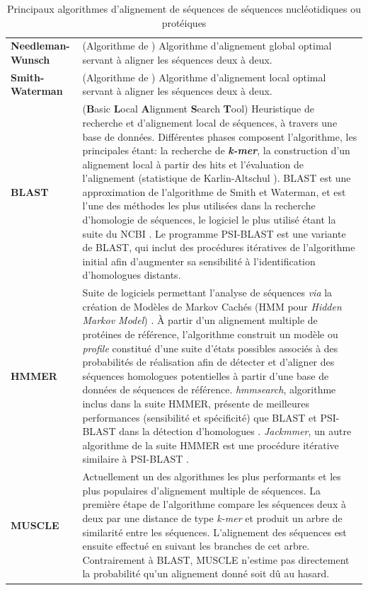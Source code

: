 \newpage
\begin{longtable}{@{\hspace{-2cm}}  >{\bfseries}p{} | >{\small}p{}}
	\caption[Principaux algorithmes d'alignement de séquences]{Principaux algorithmes d'alignement de séquences de séquences nucléotidiques ou protéiques}\label{align}\\
	 Needleman-Wunsch& (Algorithme de ) \citep{needleman1970general} Algorithme d'alignement global optimal servant à aligner les séquences deux à deux. \\[0.4cm]
	 Smith-Waterman & (Algorithme de ) \citep{smith1981identification} Algorithme d'alignement local optimal servant à aligner les séquences deux à deux. \\[0.4cm]
	BLAST & (\textbf{B}asic \textbf{L}ocal \textbf{A}lignment \textbf{S}earch \textbf{T}ool) \citep{altschul1990basic} Heuristique de recherche et d'alignement local de séquences, à travers une base de données. Différentes phases composent l'algorithme, les principales étant: la recherche de \textbf{\textit{k-mer}}, la construction d'un alignement local à partir des hits et l'évaluation de l'alignement (statistique de  Karlin-Altschul \citep{korf2003blast}). BLAST est une approximation de l'algorithme de Smith et Waterman, et est l'une des méthodes les plus utilisées dans la recherche d'homologie de séquences, le logiciel le plus utilisé étant la suite du NCBI \citep{Camacho2009}. Le programme PSI-BLAST \citep{altschul1997gapped} est une variante de BLAST, qui inclut des procédures itératives de l'algorithme initial afin d'augmenter sa sensibilité à l'identification d'homologues distants.\\[0.4cm]
	HMMER & \citep{finn2011hmmer} Suite de logiciels permettant l'analyse de séquences \textit{via} la création de Modèles de Markov Cachés (HMM pour \textit{Hidden Markov Model}) \citep{eddy1998profile}. À partir d'un alignement multiple de protéines de référence, l'algorithme construit un modèle ou \textit{profile} constitué d'une suite d'états possibles associés à des probabilités de réalisation afin de détecter et d'aligner des séquences homologues potentielles à partir d'une base de données de séquences de référence. \textit{hmmsearch}, algorithme inclus dans la suite HMMER, présente de meilleures performances (sensibilité et spécificité) que BLAST et PSI-BLAST dans la détection d'homologues \citep{Eddy2011}. \textit{Jackmmer}, un autre algorithme de la suite HMMER est une procédure itérative similaire à PSI-BLAST \citep{Eddy2013}.\\[0.4cm]
	 MUSCLE & \citep{edgar2004muscle} Actuellement un des algorithmes les plus performants et les plus populaires d'alignement multiple de séquences. La première étape de l'algorithme compare les séquences deux à deux par une distance de type \textit{k-mer} et produit un arbre de similarité entre les séquences. L'alignement des séquences est ensuite effectué en suivant les branches de cet arbre. Contrairement à BLAST, MUSCLE n'estime pas directement la probabilité qu'un alignement donné soit dû au hasard. 
	 \end{longtable}


